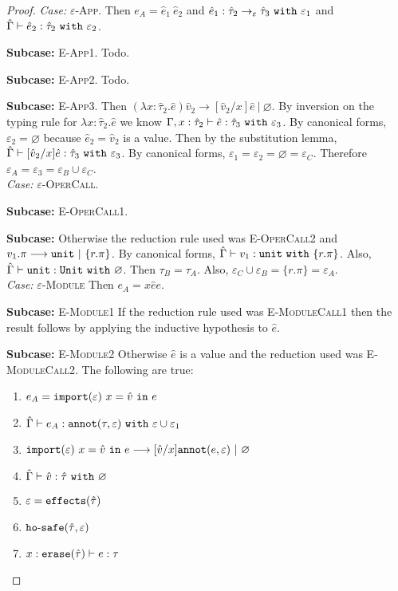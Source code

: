 \begin{appendix}
\begin{proof}
\textit{Case:} \textsc{$\varepsilon$-App}. Then $e_A = \hat e_1~\hat e_2$ and $\hat e_1: \hat \tau_2 \rightarrow_{\varepsilon} \hat \tau_3~\mathtt{with}~ \varepsilon_1$ and $\hat \Gamma \vdash \hat e_2: \hat \tau_2~\mathtt{with}~ \varepsilon_2$.

\textbf{Subcase:} \textsc{E-App1}. Todo.

\textbf{Subcase:} \textsc{E-App2}. Todo.

\textbf{Subcase:} \textsc{E-App3}. Then $(\lambda x: \hat \tau_2.\hat e)\hat v_2 \longrightarrow [\hat v_2/x]\hat e~|~\varnothing$. By inversion on the typing rule for $\lambda x: \hat \tau_2.\hat e$ we know $\Gamma, x: \hat \tau_2 \vdash \hat e: \hat \tau_3~\mathtt{with}~ \varepsilon_3$. By canonical forms, $\varepsilon_2 = \varnothing$ because $\hat e_2 = \hat v_2$ is a value. Then by the substitution lemma, $\hat \Gamma \vdash [\hat v_2/x]\hat e : \hat \tau_3~\mathtt{with}~ \varepsilon_3$. By canonical forms, $\varepsilon_1 = \varepsilon_2 = \varnothing = \varepsilon_C$. Therefore $\varepsilon_A = \varepsilon_3 = \varepsilon_B \cup \varepsilon_C$. \\

\textit{Case:}  \textsc{$\varepsilon$-OperCall}. 

\textbf{Subcase:} \textsc{E-OperCall1}.

\textbf{Subcase:} Otherwise the reduction rule used was \textsc{E-OperCall2} and $v_1.\pi \longrightarrow \mathtt{unit}~|~\{ r.\pi \}$. By canonical forms, $\hat \Gamma \vdash v_1: \mathtt{unit}~\mathtt{with}~ \{ r.\pi \}$. Also, $\hat \Gamma \vdash \mathtt{unit}: \mathtt{Unit}~\mathtt{with}~ \varnothing$. Then $\tau_B = \tau_A$. Also, $\varepsilon_C \cup \varepsilon_B = \{ r.\pi \} = \varepsilon_A$. \\

\textit{Case:} \textsc{$\varepsilon$-Module}
Then $e_A = {x}{\hat e}{e}$.

\textbf{Subcase:} \textsc{E-Module1} If the reduction rule used was \textsc{E-ModuleCall1} then the result follows by applying the inductive hypothesis to $\hat e$.

\textbf{Subcase:} \textsc{E-Module2} Otherwise $\hat e$ is a value and the reduction used was \textsc{E-ModuleCall2}. The following are true:
\begin{enumerate}
	\setlength\itemsep{-0.7em}
	\item $e_A = \mathtt{import}(\varepsilon)~x = \hat v~\mathtt{in}~ e$
	\item $\hat \Gamma \vdash e_A: \mathtt{annot}(\tau, \varepsilon)~\mathtt{with}~ \varepsilon \cup \varepsilon_1$
	\item $\mathtt{import}(\varepsilon)~x = \hat v~\mathtt{in}~ e \longrightarrow [\hat v/x]\mathtt{annot}(e, \varepsilon)~|~\varnothing$
	\item $\hat \Gamma \vdash \hat v: \hat \tau~\mathtt{with}~ \varnothing$
	\item $\varepsilon = \mathtt{effects}(\hat \tau)$
	\item $\mathtt{ho \hbox{-} safe}(\hat \tau, \varepsilon)$
	\item $x: \mathtt{erase}(\hat \tau) \vdash e: \tau$
\end{enumerate}


\end{proof}
\end{appendix}
